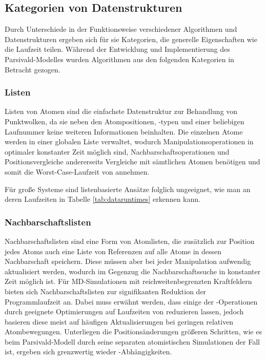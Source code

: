 \subsection{Kategorien von Datenstrukturen}

Durch Unterschiede in der Funktionsweise verschiedener Algorithmen und Datenstrukturen ergeben sich für sie Kategorien, die generelle Eigenschaften wie die Laufzeit teilen.
Während der Entwicklung und Implementierung des Parsivald-Modelles wurden Algorithmen aus den folgenden Kategorien in Betracht gezogen.

\subsubsection{Listen}

Listen von Atomen sind die einfachste Datenstruktur zur Behandlung von Punktwolken, da sie neben den Atompositionen, -typen und einer beliebigen Laufnummer keine weiteren Informationen beinhalten.
Die einzelnen Atome werden in einer globalen Liste verwaltet, wodurch Manipulationsoperationen in optimaler konstanter Zeit möglich sind, Nachbarschaftsoperationen und Positionsvergleiche andererseits Vergleiche mit sämtlichen Atomen benötigen und somit die Worst-Case-Laufzeit von  annehmen.

Für große Systeme sind listenbasierte Ansätze folglich ungeeignet, wie man an deren Laufzeiten in Tabelle \ref{tab:dataruntimes} erkennen kann.

\subsubsection{Nachbarschaftslisten}

Nachbarschaftslisten sind eine Form von Atomlisten, die zusätzlich zur Position jedes Atoms auch eine Liste von Referenzen auf alle Atome in dessen Nachbarschaft speichern.
Diese müssen aber bei jeder Manipulation aufwendig aktualisiert werden, wodurch im Gegenzug die Nachbarschaftssuche in konstanter Zeit  möglich ist.
Für MD-Simulationen mit reichweitenbegrenzten Kraftfeldern bieten sich Nachbarschaftslisten zur signifikanten Reduktion der Programmlaufzeit an.
Dabei muss erwähnt werden, dass einige der -Operationen durch geeignete Optimierungen auf Laufzeiten von  reduzieren lassen, jedoch basieren diese meist auf häufigen Aktualisierungen bei geringen relativen Atombewegungen.
Unterliegen die Positionsänderungen größeren Schritten, wie es beim Parsivald-Modell durch seine separaten atomistischen Simulationen der Fall ist, ergeben sich grenzwertig wieder -Abhängigkeiten.

